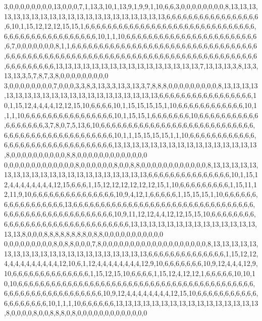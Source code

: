 3,0,0,0,0,0,0,0,0,13,0,0,0,7,1,13,3,10,1,13,9,1,9,9,1,10,6,6,3,0,0,0,0,0,0,0,0,8,13,13,13,13,13,13,13,13,13,13,13,13,13,13,13,13,13,13,13,13,13,6,6,6,6,6,6,6,6,6,6,6,6,6,6,6,6,6,6,10,1,15,12,12,12,15,15,1,6,6,6,6,6,6,6,6,6,6,6,6,6,6,6,6,6,6,6,6,6,6,6,6,6,6,6,6,6,6,6,6,6,6,6,6,6,6,6,6,6,6,6,6,6,6,6,6,10,1,1,10,6,6,6,6,6,6,6,6,6,6,6,6,6,6,6,6,6,6,6,6,6,6,6,6,6,7,0,0,0,0,0,0,0,8,1,1,6,6,6,6,6,6,6,6,6,6,6,6,6,6,6,6,6,6,6,6,6,6,6,6,6,6,6,6,6,6,6,6,6,6,6,6,6,6,6,6,6,6,6,6,6,6,6,6,6,6,6,6,6,6,6,6,6,6,6,6,6,6,6,6,6,6,6,6,6,6,6,6,6,6,6,6,6,6,6,6,6,6,6,6,6,6,6,6,6,13,13,13,13,13,13,13,13,13,13,13,13,13,13,13,13,7,13,13,13,3,8,13,3,13,13,3,5,7,8,7,3,8,0,0,0,0,0,0,0,0,0
3,0,0,0,0,0,0,0,0,7,0,0,0,3,3,8,3,13,3,3,13,3,13,3,7,8,8,8,0,0,0,0,0,0,0,0,0,8,13,13,13,13,13,13,13,13,13,13,13,13,13,13,13,13,13,13,13,13,13,6,6,6,6,6,6,6,6,6,6,6,6,6,6,6,6,6,10,1,15,12,4,4,4,4,12,12,15,10,6,6,6,6,10,1,15,15,15,15,1,10,6,6,6,6,6,6,6,6,6,6,6,6,10,1,1,1,10,6,6,6,6,6,6,6,6,6,6,6,6,6,6,6,6,10,1,15,15,1,6,6,6,6,6,6,6,10,6,6,6,6,6,6,6,6,6,6,6,6,6,6,6,6,6,6,3,7,8,0,7,5,13,6,10,6,6,6,6,6,6,6,6,6,6,6,6,6,6,6,6,6,6,6,6,6,6,6,6,6,6,6,6,6,6,6,6,6,6,6,6,6,6,6,6,6,6,6,6,6,6,6,6,10,1,1,15,15,15,15,1,1,10,6,6,6,6,6,6,6,6,6,6,6,6,6,6,6,6,6,6,6,6,6,6,6,6,6,6,6,6,6,6,6,6,13,13,13,13,13,13,13,13,13,13,13,13,13,13,13,13,8,0,0,0,0,0,0,0,0,0,0,8,8,0,0,0,0,0,0,0,0,0,0,0,0,0
0,0,0,0,0,0,0,0,0,0,0,0,0,8,0,0,0,0,0,0,8,0,0,8,8,0,0,0,0,0,0,0,0,0,0,0,0,8,13,13,13,13,13,13,13,13,13,13,13,13,13,13,13,13,13,13,13,13,13,6,6,6,6,6,6,6,6,6,6,6,6,6,6,6,10,1,15,12,4,4,4,4,4,4,4,4,12,15,6,6,6,1,15,12,12,12,12,12,12,15,1,10,6,6,6,6,6,6,6,6,6,1,15,11,12,11,9,10,6,6,6,6,6,6,6,6,6,6,6,6,6,6,6,10,9,4,12,1,6,6,6,6,6,1,15,15,15,1,10,6,6,6,6,6,6,6,6,6,6,6,6,6,6,6,6,6,13,6,6,6,6,6,6,6,6,6,6,6,6,6,6,6,6,6,6,6,6,6,6,6,6,6,6,6,6,6,6,6,6,6,6,6,6,6,6,6,6,6,6,6,6,6,6,6,6,6,6,6,6,6,10,9,11,12,12,4,4,12,12,15,15,10,6,6,6,6,6,6,6,6,6,6,6,6,6,6,6,6,6,6,6,6,6,6,6,6,6,6,6,6,6,6,6,13,13,13,13,13,13,13,13,13,13,13,13,13,13,13,13,8,0,0,0,8,8,8,8,8,8,8,8,0,8,8,0,0,0,0,0,0,0,0,0,0,0
0,0,0,0,0,0,0,0,0,8,0,8,8,0,0,0,7,8,0,0,0,0,0,0,0,0,0,0,0,0,0,0,0,0,0,0,0,8,13,13,13,13,13,13,13,13,13,13,13,13,13,13,13,13,13,13,13,13,13,6,6,6,6,6,6,6,6,6,6,6,6,6,6,1,15,12,12,4,4,4,4,4,4,4,4,4,4,12,10,6,1,12,4,4,4,4,4,4,4,4,12,9,10,6,6,6,6,6,6,6,10,9,12,4,4,4,12,9,10,6,6,6,6,6,6,6,6,6,6,6,6,6,6,1,15,12,15,10,6,6,6,6,1,15,12,4,12,12,1,6,6,6,6,6,10,10,10,10,6,6,6,6,6,6,6,6,6,6,6,6,6,6,6,6,6,6,6,6,6,6,6,6,6,6,6,6,6,6,6,6,6,6,6,6,6,6,6,6,6,6,6,6,6,6,6,6,6,6,6,6,6,6,6,6,6,6,6,6,6,10,9,12,4,4,4,4,4,4,4,4,12,15,10,6,6,6,6,6,6,6,6,6,6,6,6,6,6,6,6,6,6,6,10,1,1,1,10,6,6,6,6,6,6,13,13,13,13,13,13,13,13,13,13,13,13,13,13,13,13,8,0,0,0,0,8,0,0,8,8,8,0,8,0,0,0,0,0,0,0,0,0,0,0,0,0
